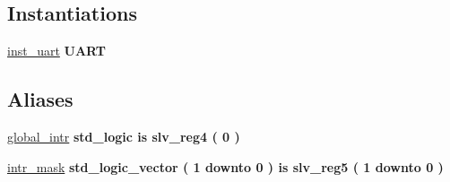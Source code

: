 \subsection*{Instantiations}
 \begin{DoxyCompactItemize}
\item 
\mbox{\label{classUART__v1__0__S00__AXI_1_1arch__imp_ac10de3465f1df3e0e99a80a6db750f9f}} 
\hyperlink{classUART__v1__0__S00__AXI_1_1arch__imp_ac10de3465f1df3e0e99a80a6db750f9f}{inst\+\_\+uart}  {\bfseries U\+A\+RT}   
\end{DoxyCompactItemize}
\subsection*{Aliases}
 \begin{DoxyCompactItemize}
\item 
\mbox{\label{classUART__v1__0__S00__AXI_1_1arch__imp_a653b661ef40f610cbcf0bba644ac034c}} 
\hyperlink{classUART__v1__0__S00__AXI_1_1arch__imp_a653b661ef40f610cbcf0bba644ac034c}{global\+\_\+intr}  {\bfseries {\bfseries \textcolor{vhdlchar}{std\+\_\+logic}\textcolor{vhdlchar}{ }\textcolor{vhdlchar}{ }\textcolor{vhdlchar}{ }\textcolor{vhdlchar}{is}\textcolor{vhdlchar}{ }\textcolor{vhdlchar}{slv\+\_\+reg4}\textcolor{vhdlchar}{ }\textcolor{vhdlchar}{(}\textcolor{vhdlchar}{ }\textcolor{vhdlchar}{ } \textcolor{vhdldigit}{0} \textcolor{vhdlchar}{ }\textcolor{vhdlchar}{)}\textcolor{vhdlchar}{ }}} {\bfseries \textcolor{vhdlchar}{ }} 
\item 
\mbox{\label{classUART__v1__0__S00__AXI_1_1arch__imp_a0cfc6c234ce00413175fbbdc0e556f1d}} 
\hyperlink{classUART__v1__0__S00__AXI_1_1arch__imp_a0cfc6c234ce00413175fbbdc0e556f1d}{intr\+\_\+mask}  {\bfseries {\bfseries \textcolor{vhdlchar}{std\+\_\+logic\+\_\+vector}\textcolor{vhdlchar}{ }\textcolor{vhdlchar}{(}\textcolor{vhdlchar}{ }\textcolor{vhdlchar}{ } \textcolor{vhdldigit}{1} \textcolor{vhdlchar}{ }\textcolor{vhdlchar}{downto}\textcolor{vhdlchar}{ }\textcolor{vhdlchar}{ } \textcolor{vhdldigit}{0} \textcolor{vhdlchar}{ }\textcolor{vhdlchar}{)}\textcolor{vhdlchar}{ }\textcolor{vhdlchar}{ }\textcolor{vhdlchar}{ }\textcolor{vhdlchar}{ }\textcolor{vhdlchar}{is}\textcolor{vhdlchar}{ }\textcolor{vhdlchar}{slv\+\_\+reg5}\textcolor{vhdlchar}{ }\textcolor{vhdlchar}{(}\textcolor{vhdlchar}{ }\textcolor{vhdlchar}{ } \textcolor{vhdldigit}{1} \textcolor{vhdlchar}{ }\textcolor{vhdlchar}{downto}\textcolor{vhdlchar}{ }\textcolor{vhdlchar}{ } \textcolor{vhdldigit}{0} \textcolor{vhdlchar}{ }\textcolor{vhdlchar}{)}\textcolor{vhdlchar}{ }}} {\bfseries \textcolor{vhdlchar}{ }} 

\end{DoxyCompactItemize}
